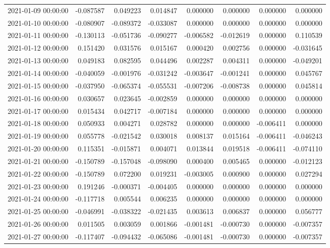 \begin{tabular}{lrrrrrrr}
2021-01-09 00:00:00 & -0.087587 & 0.049223 & 0.014847 & 0.000000 & 0.000000 & 0.000000 & 0.000000 \\
2021-01-10 00:00:00 & -0.080907 & -0.089372 & -0.033087 & 0.000000 & 0.000000 & 0.000000 & 0.000000 \\
2021-01-11 00:00:00 & -0.130113 & -0.051736 & -0.090277 & -0.006582 & -0.012619 & 0.000000 & 0.110539 \\
2021-01-12 00:00:00 & 0.151420 & 0.031576 & 0.015167 & 0.000420 & 0.002756 & 0.000000 & -0.031645 \\
2021-01-13 00:00:00 & 0.049183 & 0.082595 & 0.044496 & 0.002287 & 0.004311 & 0.000000 & -0.049201 \\
2021-01-14 00:00:00 & -0.040059 & -0.001976 & -0.031242 & -0.003647 & -0.001241 & 0.000000 & 0.045767 \\
2021-01-15 00:00:00 & -0.037950 & -0.065374 & -0.055531 & -0.007206 & -0.008738 & 0.000000 & 0.045814 \\
2021-01-16 00:00:00 & 0.030657 & 0.023645 & -0.002859 & 0.000000 & 0.000000 & 0.000000 & 0.000000 \\
2021-01-17 00:00:00 & 0.015434 & 0.042717 & -0.007184 & 0.000000 & 0.000000 & 0.000000 & 0.000000 \\
2021-01-18 00:00:00 & 0.050933 & 0.004271 & 0.028782 & 0.000000 & 0.000000 & -0.006411 & 0.000000 \\
2021-01-19 00:00:00 & 0.055778 & -0.021542 & 0.030018 & 0.008137 & 0.015164 & -0.006411 & -0.046243 \\
2021-01-20 00:00:00 & 0.115351 & -0.015871 & 0.004071 & 0.013844 & 0.019518 & -0.006411 & -0.074110 \\
2021-01-21 00:00:00 & -0.150789 & -0.157048 & -0.098090 & 0.000400 & 0.005465 & 0.000000 & -0.012123 \\
2021-01-22 00:00:00 & -0.150789 & 0.072200 & 0.019231 & -0.003005 & 0.000900 & 0.000000 & 0.027294 \\
2021-01-23 00:00:00 & 0.191246 & -0.000371 & -0.004405 & 0.000000 & 0.000000 & 0.000000 & 0.000000 \\
2021-01-24 00:00:00 & -0.117718 & 0.005544 & 0.006235 & 0.000000 & 0.000000 & 0.000000 & 0.000000 \\
2021-01-25 00:00:00 & -0.046991 & -0.038322 & -0.021435 & 0.003613 & 0.006837 & 0.000000 & 0.056777 \\
2021-01-26 00:00:00 & 0.011505 & 0.003059 & 0.001866 & -0.001481 & -0.000730 & 0.000000 & -0.007357 \\
2021-01-27 00:00:00 & -0.117407 & -0.094432 & -0.065086 & -0.001481 & -0.000730 & 0.000000 & -0.007357 \\

\end{tabular}
